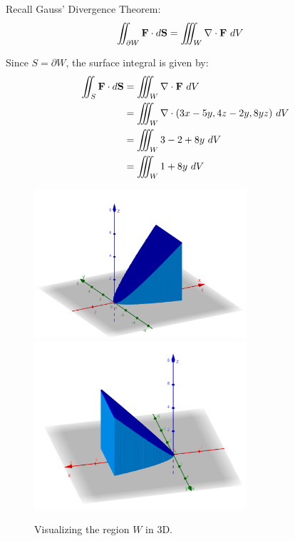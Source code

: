 \begin{solution}
    Recall Gauss' Divergence Theorem:
    \begin{align}
        \iint_{\partial W} \vb{F} \cdot d\vb{S} &= \iiint_W \nabla \cdot \vb{F} \ dV
    \end{align}
    
    Since \(S = \partial W\), the surface integral is given by:
    \begin{align*}
        \iint_{S} \vb{F} \cdot d\vb{S} &= \iiint_W \nabla \cdot \vb{F} \ dV \\
        &= \iiint_W \nabla \cdot (3x - 5y, 4z - 2y, 8yz) \ dV \\
        &= \iiint_W 3 - 2 + 8y \ dV \\
        &= \iiint_W 1 + 8y \ dV
    \end{align*}
    
    \newpage 
    
    \begin{figure}[h!]
        \centering
        \includegraphics[width=0.7\textwidth]{Pictures/Tutorial 10-1.png} \\
        \includegraphics[width=0.7\textwidth]{Pictures/Tutorial 10-2.png}
        \caption{Visualizing the region \(W\) in 3D.}
    \end{figure}
    

\end{solution}
